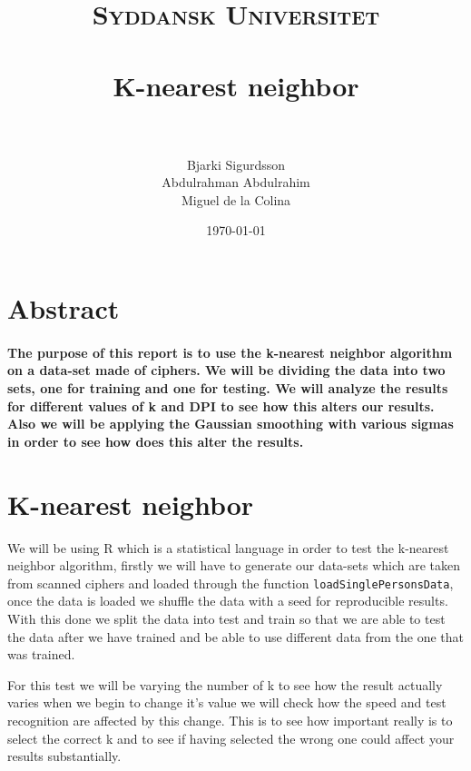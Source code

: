 \documentclass[paper=a4, fontsize=11pt]{scrartcl} %
\title{	
\normalfont \normalsize 
\textsc{Syddansk Universitet} \\ [25pt] 
\horrule{0.5pt} \\[0.4cm] %
\huge K-nearest neighbor \\ %
\horrule{2pt} \\[0.5cm] %
}
\author{Bjarki Sigurdsson \\ Abdulrahman Abdulrahim \\ Miguel de la Colina}
\date{\normalsize\today} %
\numberwithin{equation}{section} %
\numberwithin{figure}{section} %
\numberwithin{table}{section} %
\begin{document}
\maketitle %



\section*{Abstract}

\paragraph{The purpose of this report is to use the k-nearest neighbor algorithm on a data-set made of ciphers. We will be dividing the data into two sets, one for training and one for testing. We will analyze the results for different values of k and DPI to see how this alters our results. Also we will be applying the  Gaussian smoothing with various sigmas in order to see how does this alter the results.}  




\section{K-nearest neighbor}
\begin{flushleft}
We will be using R which is a statistical language in order to test the k-nearest neighbor algorithm, firstly we will have to generate our data-sets which are taken from scanned ciphers and loaded through the function \texttt{loadSinglePersonsData}, once the data is loaded we shuffle the data with a seed for reproducible results. With this done we split the data into test and train so that we are able to test the data after we have trained and be able to use different data from the one that was trained.
\end{flushleft}

\begin{flushleft}
For this test we will be varying the number of k to see how the result actually varies when we begin to change it's value we will check how the speed and test recognition are affected by this change. This is to see how important really is to select the correct k and to see if having selected the wrong one could affect your results substantially.
\end{flushleft}
\end{document}

